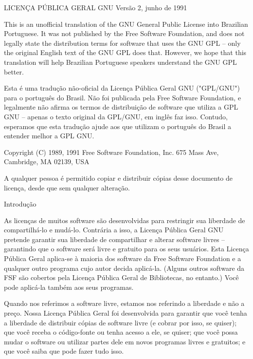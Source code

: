 {\small
\begin{center}
		      LICENÇA PÚBLICA GERAL GNU
		       Versão 2, junho de 1991
\end{center}

 This is an unofficial translation of the GNU General Public License
 into Brazilian Portuguese. It was not published by the Free Software
   Foundation, and does not legally state the distribution terms for
   software that uses the GNU GPL -- only the original English text of
   the GNU GPL does that. However, we hope that this translation will
  help Brazilian Portuguese speakers understand the GNU GPL better.

  Esta é uma tradução não-oficial da Licença Pública Geral GNU ("GPL/GNU") para o português do Brasil. Não foi publicada pela Free Software Foundation, e legalmente não afirma os termos de distribuição de software que utiliza a GPL GNU -- apenas o texto original da GPL/GNU, em inglês faz isso. Contudo, esperamos que esta tradução ajude aos que utilizam o português do Brasil a entender melhor a GPL GNU.

   Copyright (C) 1989, 1991 Free Software Foundation, Inc. 675 Mass Ave,
		        Cambridge, MA 02139, USA

A qualquer pessoa é permitido copiar e distribuir cópias desse documento de licença, desde que sem qualquer alteração.
\begin{center}
			      Introdução
\end{center}

  As licenças de muitos software são desenvolvidas para restringir sua
liberdade de compartilhá-lo e mudá-lo. Contrária a isso, a Licença
Pública Geral GNU pretende garantir sua liberdade de compartilhar e
alterar software livres -- garantindo que o software será livre e
gratuito para os seus usuários. Esta Licença Pública Geral aplica-se à
maioria dos software da Free Software Foundation e a qualquer outro
programa cujo autor decida aplicá-la. (Alguns outros software da FSF
são cobertos pela Licença Pública Geral de Bibliotecas, no entanto.)
Você pode aplicá-la também aos seus programas.

  Quando nos referimos a software livre, estamos nos referindo a
liberdade e não a preço. Nossa Licença Pública Geral foi desenvolvida
para garantir que você tenha a liberdade de distribuir cópias de
software livre (e cobrar por isso, se quiser); que você receba o
código-fonte ou tenha acesso a ele, se quiser; que você possa mudar o
software ou utilizar partes dele em novos programas livres e
gratuitos; e que você saiba que pode fazer tudo isso.

}

